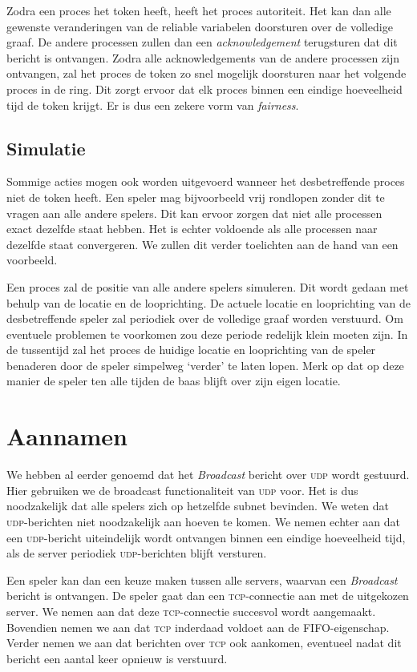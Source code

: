 \documentclass[a4paper,11pt]{article}
\newcommand{\udp}{\textsc{udp}\xspace}
\newcommand{\tcp}{\textsc{tcp}\xspace}
\begin{document}
    Zodra een proces het token heeft, heeft het proces autoriteit. Het kan dan alle gewenste veranderingen van de reliable variabelen doorsturen over de volledige graaf. De andere processen zullen dan een \emph{acknowledgement} terugsturen dat dit bericht is ontvangen. Zodra alle acknowledgements van de andere processen zijn ontvangen, zal het proces de token zo snel mogelijk doorsturen naar het volgende proces in de ring. Dit zorgt ervoor dat elk proces binnen een eindige hoeveelheid tijd de token krijgt. Er is dus een zekere vorm van \emph{fairness}.

    \subsection{Simulatie}
    Sommige acties mogen ook worden uitgevoerd wanneer het desbetreffende proces niet de token heeft. Een speler mag bijvoorbeeld vrij rondlopen zonder dit te vragen aan alle andere spelers. Dit kan ervoor zorgen dat niet alle processen exact dezelfde staat hebben. Het is echter voldoende als alle processen naar dezelfde staat convergeren. We zullen dit verder toelichten aan de hand van een voorbeeld.

    Een proces zal de positie van alle andere spelers simuleren. Dit wordt gedaan met behulp van de locatie en de looprichting. De actuele locatie en looprichting van de desbetreffende speler zal periodiek over de volledige graaf worden verstuurd. Om eventuele problemen te voorkomen zou deze periode redelijk klein moeten zijn. In de tussentijd zal het proces de huidige locatie en looprichting van de speler benaderen door de speler simpelweg `verder' te laten lopen. Merk op dat op deze manier de speler ten alle tijden de baas blijft over zijn eigen locatie.

    \section{Aannamen}
    We hebben al eerder genoemd dat het \emph{Broadcast} bericht over \udp wordt gestuurd. Hier gebruiken we de broadcast functionaliteit van \udp voor. Het is dus noodzakelijk dat alle spelers zich op hetzelfde subnet bevinden. We weten dat \udp-berichten niet noodzakelijk aan hoeven te komen. We nemen echter aan dat een \udp-bericht uiteindelijk wordt ontvangen binnen een eindige hoeveelheid tijd, als de server periodiek \udp-berichten blijft versturen.

    Een speler kan dan een keuze maken tussen alle servers, waarvan een \emph{Broadcast} bericht is ontvangen. De speler gaat dan een \tcp-connectie aan met de uitgekozen server. We nemen aan dat deze \tcp-connectie succesvol wordt aangemaakt. Bovendien nemen we aan dat \tcp inderdaad voldoet aan de FIFO-eigenschap. Verder nemen we aan dat berichten over \tcp ook aankomen, eventueel nadat dit bericht een aantal keer opnieuw is verstuurd.
\end{document}
